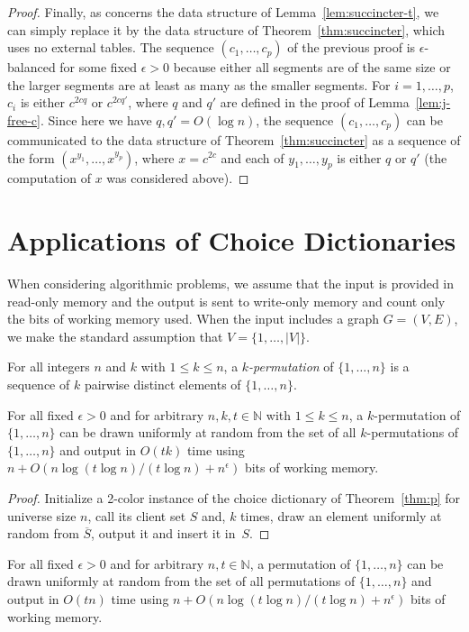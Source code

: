 \documentclass[envcountsame,envcountsect,undated,nolinenumbers]{lnthi}
\def\TbbbN{\mathbb{N}}
\begin{document}
\begin{proof}
Finally, as concerns the data structure of
Lemma~\ref{lem:succincter-t}, we can simply replace
it by the data structure of Theorem~\ref{thm:succincter},
which uses no external tables.
The sequence $(c_1,\ldots,c_p)$
of the previous proof is $\epsilon$-balanced
for some fixed $\epsilon>0$
because either all segments are of the same size
or the larger segments are at least as
many as the smaller segments.
For $i=1,\ldots,p$, $c_i$ is either $c^{2 c q}$
or $c^{2 c q'}$, where $q$ and $q'$ are
defined in the proof of Lemma~\ref{lem:j-free-c}.
Since here we have
$q,q'=O(\log n)$, the sequence $(c_1,\ldots,c_p)$
can be communicated to the data structure
of Theorem~\ref{thm:succincter} as a sequence
of the form $(x^{y_1},\ldots,x^{y_p})$,
where $x=c^{2 c}$ and each of $y_1,\ldots,y_p$
is either $q$ or $q'$
(the computation of $x$ was considered above).
\end{proof}

\section{Applications of Choice Dictionaries}

When considering algorithmic problems, we assume
that the input is provided in read-only memory and
the output is sent to write-only memory
and count only the bits of working memory used.
When the input includes a graph $G=(V,E)$,
we make the standard assumption that $V=\{1,\ldots,|V|\}$.

For all integers
$n$ and $k$ with $1\le k\le n$, a \emph{$k$-permutation}
of $\{1,\ldots,n\}$ is
a sequence of $k$ pairwise distinct elements
of $\{1,\ldots,n\}$.

\begin{theorem}
For all fixed $\epsilon>0$ and
for arbitrary $n,k,t\in\TbbbN$ with $1\le k\le n$,
a $k$-permutation of $\{1,\ldots,n\}$
can be drawn uniformly at
random from the set of all $k$-permutations
of $\{1,\ldots,n\}$
and output in $O(t k)$ time using
$n+O({{n\log(t\log n)}/{(t\log n)}}+n^\epsilon)$ bits of
working memory.
\end{theorem}

\begin{proof}
Initialize a 2-color instance of the
choice dictionary of Theorem~\ref{thm:p}
for universe size $n$,
call its client set $S$ and,
$k$ times, draw an element
uniformly at random from $\overline{S}$,
output it and insert it in~$S$.
\end{proof}

\begin{corollary}
For all fixed $\epsilon>0$ and
for arbitrary $n,t\in\TbbbN$, a
permutation of $\{1,\ldots,n\}$
can be drawn uniformly at random
from the set of all permutations of $\{1,\ldots,n\}$
and output
in $O(t n)$ time using
$n+O({{n\log(t\log n)}/{(t\log n)}}+n^\epsilon)$ bits of
working memory.
\end{corollary}
\end{document}
